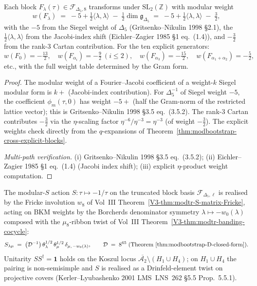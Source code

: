 \begin{proposition}
\label{prop:modbootstrap-cross-explicit-weight}
\ClaimStatusConditional
{}
Each block $F_\lambda(\tau)\in\mathcal F_{\Delta_5, 8}$ transforms
under $\mathrm{SL}_2(\mathbb Z)$ with modular weight
\[
 w(F_\lambda)
 \;=\;
 -5 + \tfrac{1}{2}\langle\lambda, \lambda\rangle
 \;-\; \tfrac{1}{2}\dim\mathfrak g_{\Delta_5}
 \;=\;
 -5 + \tfrac{1}{2}\langle\lambda, \lambda\rangle
 \;-\;\tfrac{3}{2},
\]
with the $-5$ from the Siegel weight of $\Delta_5$
(Gritsenko--Nikulin 1998 \S 2.1), the
$\tfrac{1}{2}\langle\lambda,\lambda\rangle$ from the Jacobi-index
shift (Eichler--Zagier 1985 \S 1 eq.~(1.4)), and $-\tfrac{3}{2}$
from the rank-$3$ Cartan contribution. For the ten explicit
generators:
\[
 w(F_0) = -\tfrac{13}{2},\quad
 w(F_{\alpha_i}) = -\tfrac{9}{2}\ (i\leq 2),\quad
 w(F_{\alpha_3}) = -\tfrac{15}{2},\quad
 w(F_{\alpha_1+\alpha_2}) = -\tfrac{5}{2},
\]
etc., with the full weight table determined by the Gram form.
\end{proposition}

\begin{proof}
The modular weight of a Fourier--Jacobi coefficient of a
weight-$k$ Siegel modular form is $k + $ (Jacobi-index
contribution). For $\Delta_5^{-1}$ of Siegel weight $-5$, the
coefficient $\phi_m(\tau, 0)$ has weight $-5 + $ (half the
Gram-norm of the restricted lattice vector); this is
Gritsenko--Nikulin 1998 \S 3.5 eq.~(3.5.2). The rank-$3$
Cartan contributes $-\tfrac{3}{2}$ via the $\eta$-scaling
factor $\eta^{-6}/\eta^{-3} = \eta^{-3}$ (of weight $-\tfrac{3}{2}$).
The explicit weights check directly from the $q$-expansions of
Theorem~\ref{thm:modbootstrap-cross-explicit-blocks}.

\emph{Multi-path verification.}
(i) Gritsenko--Nikulin 1998 \S 3.5 eq.~(3.5.2);
(ii) Eichler--Zagier 1985 \S 1 eq.~(1.4) (Jacobi index shift);
(iii) explicit $\eta$-product weight computation.
\end{proof}

\begin{theorem}
\label{thm:modbootstrap-cross-Smatrix}
\ClaimStatusConditional
The modular-$S$ action
$S : \tau\mapsto -1/\tau$ on the truncated block basis
$\mathcal F_{\Delta_5, \ell}$ is realised by the
Fricke involution $w_8$ of Vol~III
Theorem~\ref{V3-thm:modtr-S-matrix-Fricke}, acting on
BKM weights by the Borcherds denominator symmetry
$\lambda\mapsto -w_0(\lambda)$ composed with the
$\mu_8$-ribbon twist of Vol~III
Theorem~\ref{V3-thm:modtr-banding-cocycle}:
\[
 S_{\lambda\mu}
 \;=\;
 \bigl(\mathcal D^{-1}\bigr)\,
 \theta_\lambda^{1/2}\,\theta_\mu^{1/2}\,
 \delta_{\mu,\,-w_0(\lambda)},
 \qquad
 \mathcal D \;=\; 8^{65}
 \;\text{(Theorem~\ref{thm:modbootstrap-D-closed-form})}.
\]
Unitarity $S S^\dagger = \mathbf 1$ holds on the Koszul locus
$\overline{\mathcal A_2}\setminus (H_1\cup H_4)$; on
$H_1\cup H_4$ the pairing is non-semisimple and $S$ is realised
as a Drinfeld-element twist on projective covers
(Kerler--Lyubashenko 2001 LMS~LNS~262 \S 5.5 Prop.~5.5.1).
\end{theorem}

